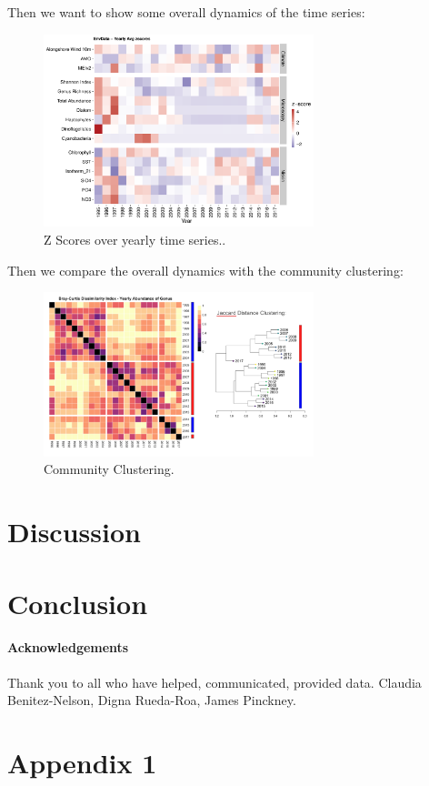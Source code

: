 \documentclass[a4paper]{article}
\begin{document}
            Then we want to show some overall dynamics of the time series:
            
            \begin{figure}[ht]
            \centering
            \includegraphics[width=0.7\textwidth]{fig/PLOTZScores.pdf}
            \caption{Z Scores over yearly time series..}
            \label{fig:example}
        \end{figure}
    
             Then we compare the overall dynamics with the community clustering:
            
            \begin{figure}[ht]
            \centering
            \includegraphics[width=0.7\textwidth]{fig/Screenshot 2024-08-09 at 11.10.58.png}
            \caption{Community Clustering.}
            \label{fig:example}
        \end{figure}
    
    \section{Discussion}
    \label{sec:discussion}
    
    
        \section{Conclusion}
    \label{sec:conclusion}
    
    
    
    \paragraph{Acknowledgements} Thank you to all who have helped, communicated, provided data. Claudia Benitez-Nelson, Digna Rueda-Roa, James Pinckney.
    
    
    
    \appendix
    
    \section{Appendix 1}
    \label{app:1}
	
	
\end{document}
